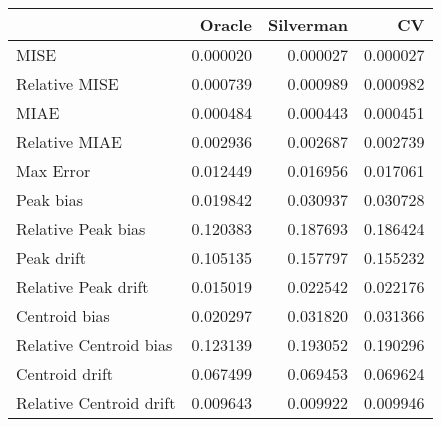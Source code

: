 \begin{tabular}{lrrr}
  \hline
 & Oracle & Silverman & CV \\ 
  \hline
MISE & 0.000020 & 0.000027 & 0.000027 \\ 
  Relative MISE & 0.000739 & 0.000989 & 0.000982 \\ 
  MIAE & 0.000484 & 0.000443 & 0.000451 \\ 
  Relative MIAE & 0.002936 & 0.002687 & 0.002739 \\ 
  Max Error & 0.012449 & 0.016956 & 0.017061 \\ 
  Peak bias & 0.019842 & 0.030937 & 0.030728 \\ 
  Relative Peak bias & 0.120383 & 0.187693 & 0.186424 \\ 
  Peak drift & 0.105135 & 0.157797 & 0.155232 \\ 
  Relative Peak drift & 0.015019 & 0.022542 & 0.022176 \\ 
  Centroid bias & 0.020297 & 0.031820 & 0.031366 \\ 
  Relative Centroid bias & 0.123139 & 0.193052 & 0.190296 \\ 
  Centroid drift & 0.067499 & 0.069453 & 0.069624 \\ 
  Relative Centroid drift & 0.009643 & 0.009922 & 0.009946 \\ 
   \hline
\end{tabular}
